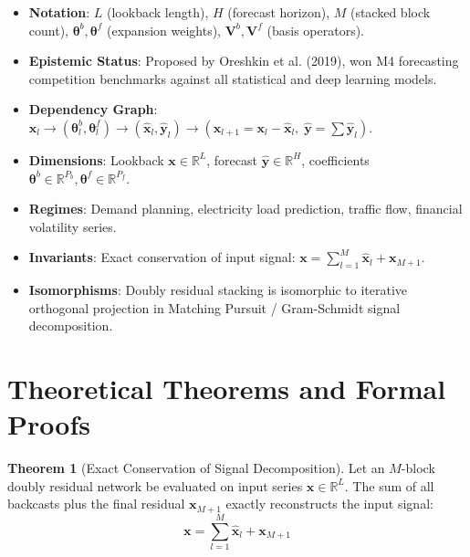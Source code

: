 \documentclass[11pt,a4paper]{article}
\theoremstyle{definition}
\newtheorem{theorem}{\textbf{Theorem}}[section]
\begin{document}
\begin{itemize}
    \item \textbf{Notation}: $L$ (lookback length), $H$ (forecast horizon), $M$ (stacked block count), $\boldsymbol{\theta}^b, \boldsymbol{\theta}^f$ (expansion weights), $\mathbf{V}^b, \mathbf{V}^f$ (basis operators).
    \item \textbf{Epistemic Status}: Proposed by Oreshkin et al. (2019), won M4 forecasting competition benchmarks against all statistical and deep learning models.
    \item \textbf{Dependency Graph}: $\mathbf{x}_l \to (\boldsymbol{\theta}_l^b, \boldsymbol{\theta}_l^f) \to (\widehat{\mathbf{x}}_l, \widehat{\mathbf{y}}_l) \to (\mathbf{x}_{l+1} = \mathbf{x}_l - \widehat{\mathbf{x}}_l, \; \widehat{\mathbf{y}} = \sum \widehat{\mathbf{y}}_l)$.
    \item \textbf{Dimensions}: Lookback $\mathbf{x} \in \mathbb{R}^L$, forecast $\widehat{\mathbf{y}} \in \mathbb{R}^H$, coefficients $\boldsymbol{\theta}^b \in \mathbb{R}^{P_b}, \boldsymbol{\theta}^f \in \mathbb{R}^{P_f}$.
    \item \textbf{Regimes}: Demand planning, electricity load prediction, traffic flow, financial volatility series.
    \item \textbf{Invariants}: Exact conservation of input signal: $\mathbf{x} = \sum_{l=1}^M \widehat{\mathbf{x}}_l + \mathbf{x}_{M+1}$.
    \item \textbf{Isomorphisms}: Doubly residual stacking is isomorphic to iterative orthogonal projection in Matching Pursuit / Gram-Schmidt signal decomposition.
\end{itemize}

\section{Theoretical Theorems and Formal Proofs}

\begin{theorem}[Exact Conservation of Signal Decomposition]
Let an $M$-block doubly residual network be evaluated on input series $\mathbf{x} \in \mathbb{R}^L$. The sum of all backcasts plus the final residual $\mathbf{x}_{M+1}$ exactly reconstructs the input signal:
{\boldmath
\begin{equation}
\mathbf{x} = \sum_{l=1}^M \widehat{\mathbf{x}}_l + \mathbf{x}_{M+1}
\end{equation}
}
\end{theorem}
\end{document}
